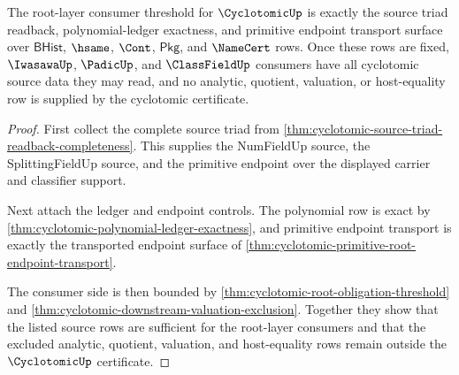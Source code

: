 \begin{theorem}
\label{thm:cyclotomic-root-layer-consumer-threshold}
The root-layer consumer threshold for $\CyclotomicUp$ is exactly the source
triad readback, polynomial-ledger exactness, and primitive endpoint transport
surface over $\mathsf{BHist}$, $\hsame$, $\Cont$, $\mathsf{Pkg}$, and
$\NameCert$ rows. Once these rows are fixed, $\IwasawaUp$, $\PadicUp$, and
$\ClassFieldUp$ consumers have all cyclotomic source data they may read, and no
analytic, quotient, valuation, or host-equality row is supplied by the
cyclotomic certificate.
\end{theorem}
\begin{proof}
First collect the complete source triad from
\autoref{thm:cyclotomic-source-triad-readback-completeness}. This supplies the
NumFieldUp source, the SplittingFieldUp source, and the primitive endpoint over
the displayed carrier and classifier support.

Next attach the ledger and endpoint controls. The polynomial row is exact by
\autoref{thm:cyclotomic-polynomial-ledger-exactness}, and primitive endpoint
transport is exactly the transported endpoint surface of
\autoref{thm:cyclotomic-primitive-root-endpoint-transport}.

The consumer side is then bounded by
\autoref{thm:cyclotomic-root-obligation-threshold} and
\autoref{thm:cyclotomic-downstream-valuation-exclusion}. Together they show
that the listed source rows are sufficient for the root-layer consumers and
that the excluded analytic, quotient, valuation, and host-equality rows remain
outside the $\CyclotomicUp$ certificate.
\end{proof}
